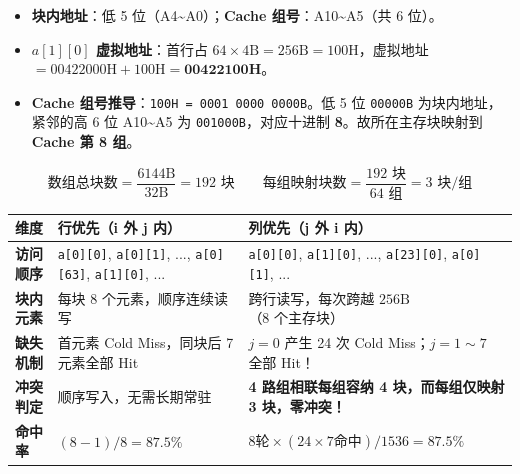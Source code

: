\documentclass[10pt,a4paper]{ctexart}
\begin{document}

\begin{itemize}

\item \textbf{块内地址}：低 5 位（A4\textasciitilde{}A0）；\textbf{Cache 组号}：A10\textasciitilde{}A5（共 6 位）。

\item \textbf{$a[1][0]$ 虚拟地址}：首行占 $64 \times 4\mathrm{B}=256\mathrm{B}=100\mathrm{H}$，虚拟地址 $=00422000\mathrm{H}+100\mathrm{H}=\mathbf{00422100H}$。

\item \textbf{Cache 组号推导}：\texttt{100H = 0001 0000 0000B}。低 5 位 \texttt{00000B} 为块内地址，紧邻的高 6 位 A10\textasciitilde{}A5 为 \texttt{001000B}，对应十进制 \textbf{8}。故所在主存块映射到 \textbf{Cache 第 8 组}。

\end{itemize}


\[
\text{数组总块数} = \frac{6144\mathrm{B}}{32\mathrm{B}} = 192\text{ 块} \qquad \text{每组映射块数} = \frac{192\text{ 块}}{64\text{ 组}} = 3\text{ 块/组}
\]

\begin{center}\small
\begin{tabularx}{\linewidth}{@{}>{\raggedright\arraybackslash}X>{\raggedright\arraybackslash}X>{\raggedright\arraybackslash}X@{}}
\toprule
维度 & 行优先（i 外 j 内） & 列优先（j 外 i 内） \\
\midrule
\textbf{访问顺序} & \texttt{a[0][0]}, \texttt{a[0][1]}, ..., \texttt{a[0][63]}, \texttt{a[1][0]}, ... & \texttt{a[0][0]}, \texttt{a[1][0]}, ..., \texttt{a[23][0]}, \texttt{a[0][1]}, ... \\
\textbf{块内元素} & 每块 8 个元素，顺序连续读写 & 跨行读写，每次跨越 $256\mathrm{B}$（8 个主存块） \\
\textbf{缺失机制} & 首元素 Cold Miss，同块后 7 元素全部 Hit & $j=0$ 产生 24 次 Cold Miss；$j=1\sim7$ 全部 Hit！ \\
\textbf{冲突判定} & 顺序写入，无需长期常驻 & \textbf{4 路组相联每组容纳 4 块，而每组仅映射 3 块，零冲突！} \\
\textbf{命中率} & $(8-1)/8 = \mathbf{87.5\%}$ & $8 \text{轮} \times (24 \times 7 \text{命中}) / 1536 = \mathbf{87.5\%}$ \\
\bottomrule
\end{tabularx}
\end{center}
\end{document}
